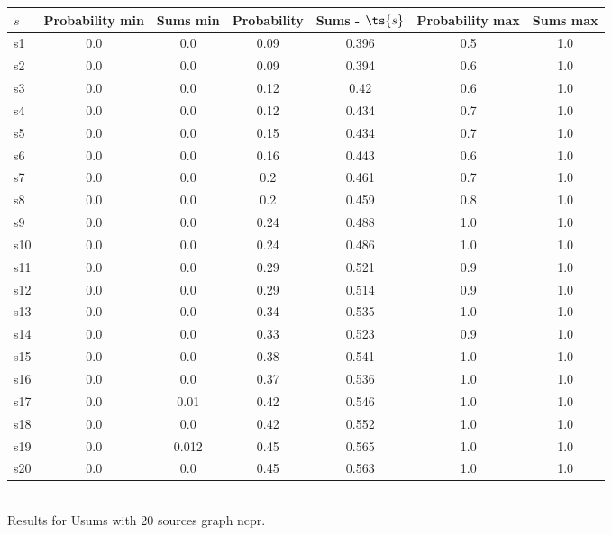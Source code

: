\documentclass{article}
\begin{document}
\noindent\begin{tabular}{|l|c|c|c|c|c|c|}
\hline
$s$& Probability min & Sums min & Probability & Sums - $\ts{s}$ & Probability max & Sums max\\
\hline
s1 &0.0 & 0.0 & 0.09 & 0.396 & 0.5 & 1.0\\
\hline
s2 &0.0 & 0.0 & 0.09 & 0.394 & 0.6 & 1.0\\
\hline
s3 &0.0 & 0.0 & 0.12 & 0.42 & 0.6 & 1.0\\
\hline
s4 &0.0 & 0.0 & 0.12 & 0.434 & 0.7 & 1.0\\
\hline
s5 &0.0 & 0.0 & 0.15 & 0.434 & 0.7 & 1.0\\
\hline
s6 &0.0 & 0.0 & 0.16 & 0.443 & 0.6 & 1.0\\
\hline
s7 &0.0 & 0.0 & 0.2 & 0.461 & 0.7 & 1.0\\
\hline
s8 &0.0 & 0.0 & 0.2 & 0.459 & 0.8 & 1.0\\
\hline
s9 &0.0 & 0.0 & 0.24 & 0.488 & 1.0 & 1.0\\
\hline
s10 &0.0 & 0.0 & 0.24 & 0.486 & 1.0 & 1.0\\
\hline
s11 &0.0 & 0.0 & 0.29 & 0.521 & 0.9 & 1.0\\
\hline
s12 &0.0 & 0.0 & 0.29 & 0.514 & 0.9 & 1.0\\
\hline
s13 &0.0 & 0.0 & 0.34 & 0.535 & 1.0 & 1.0\\
\hline
s14 &0.0 & 0.0 & 0.33 & 0.523 & 0.9 & 1.0\\
\hline
s15 &0.0 & 0.0 & 0.38 & 0.541 & 1.0 & 1.0\\
\hline
s16 &0.0 & 0.0 & 0.37 & 0.536 & 1.0 & 1.0\\
\hline
s17 &0.0 & 0.01 & 0.42 & 0.546 & 1.0 & 1.0\\
\hline
s18 &0.0 & 0.0 & 0.42 & 0.552 & 1.0 & 1.0\\
\hline
s19 &0.0 & 0.012 & 0.45 & 0.565 & 1.0 & 1.0\\
\hline
s20 &0.0 & 0.0 & 0.45 & 0.563 & 1.0 & 1.0\\
\hline
\end{tabular}\\

\noindent Results for Usums with 20 sources graph ncpr.
\end{document}
